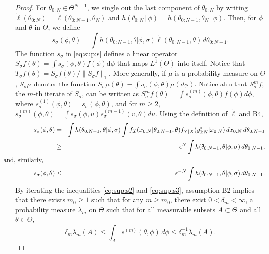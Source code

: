 \documentclass[11pt]{article}
\newcommand\given{{\, | \,}}
\newcommand\mZero{{m_0}}
\def\rmd{\mathrm{d}}
\begin{document}
\begin{proof}
For $\theta_{0:N}\in \Theta^{N+1}$, we single out the last component of $\theta_{0:N}$ by writing  $\breve\ell(\theta_{0:N})= \breve\ell(\theta_{0:N-1},\theta_N)$ and  $h(\theta_{0:N}\given \phi)=h(\theta_{0:N-1},\theta_N\given \phi)$. Then, for $\phi$ and $\theta$ in $\Theta$, we define 
\begin{equation} \label{eq:sup:s}
s_\sigma(\phi,\theta)=\int h(\theta_{0:N-1},\theta\vert \phi,\sigma)\breve \ell(\theta_{0:N-1},\theta)\, d\theta_{0:N-1}.
\end{equation}
 The function $s_\sigma$ in \eqref{eq:sup:s} defines a linear operator $S_\sigma f(\theta)=\int s_\sigma(\phi,\theta) f(\phi)\rmd \phi$ that maps $L^1(\Theta)$ into itself. 
Notice that  $T_\sigma f(\theta) =S_\sigma f(\theta)/\| S_\sigma f\|_1$. 
More generally, if $\mu$ is a probability measure on $\Theta$, $S_\sigma \mu$ denotes  the function $S_\sigma\mu(\theta)=\int s_\sigma(\phi,\theta)\mu(d\phi)$. 
Notice also that $S_\sigma^m f$, the $m$-th iterate of $S_\sigma$, can be written as $S_\sigma^m f(\theta)=\int s^{(m)}_\sigma(\phi,\theta) f(\phi)d\phi$, where $s^{(1)}_\sigma(\phi,\theta) =s_\sigma(\phi,\theta)$, and for $m\geq 2$, $s^{(m)}_\sigma(\phi,\theta) =\int s_\sigma(\phi,u) s^{(m-1)}_\sigma(u,\theta) du$. 
Using the definition of $\breve\ell$ and B4,
\begin{eqnarray} \nonumber
s_\sigma(\phi,\theta)&=& \int h(\theta_{0:N-1},\theta\vert \phi,\sigma)\int f_X(x_{0:N}\vert \theta_{0:N-1},\theta)f_{Y\vert X}(y^*_{1:N}\vert x_{0:N})\, d x_{0:N}\, d \theta_{0:N-1}\\
&\geq& 
\label{eq:sup:s2}
\epsilon^N \int h(\theta_{0:N-1},\theta\vert \phi,\sigma)\, d \theta_{0:N-1},
\\
\nonumber
\mbox{\hspace{-6.5mm}and, similarly,}\hspace{6.5mm}&&
\\
\label{eq:sup:s3}
s_\sigma(\phi,\theta)&\leq& \epsilon^{-N}\int h(\theta_{0:N-1},\theta\vert \phi,\sigma)\, d \theta_{0:N-1}.
\end{eqnarray}
By iterating the inequalities \eqref{eq:sup:s2} and  \eqref{eq:sup:s3}, assumption B2 implies that there exists $\mZero\geq 1$ such that for any $m\geq \mZero$, there exist $0<\delta_{m}<\infty$, a probability measure $\lambda_m $ on $\Theta$ such that for all measurable subsets $A\subset\Theta$ and all $\theta\in\Theta$,
\begin{equation}\label{mixing}
\delta_{m}\lambda_m(A)\leq \int _A s^{(m)}(\theta,\phi)\, d \phi \leq \delta_{m}^{-1}\lambda_m(A).\end{equation}

\end{proof}
\end{document}
